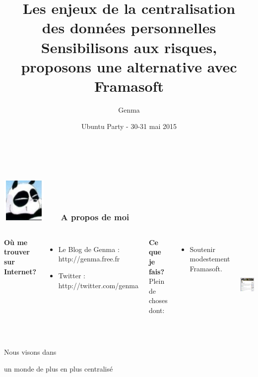 \documentclass{beamer}
\title[]{
Les enjeux de la centralisation \\ des données personnelles \\ Sensibilisons aux risques,  \\proposons une alternative avec Framasoft}
\author{Genma}
\date{Ubuntu Party - 30-31 mai 2015}
\begin{document}
\begin{frame}
	\titlepage
	\vfill
	\begin{center}
		\\[2.5ex]
		{\tiny\CcNote{\CcLongnameByNcSa}}
		\vspace*{-2.5ex}
	\end{center}
\end{frame}

\begin{frame}
\frametitle{\includegraphics[scale=0.4]{./images/Genma.jpg} \ \ \  A propos de moi  }
\begin{columns}[c] 

\textbf{Où me trouver sur Internet?}
\begin{itemize}
\item Le Blog de Genma : http://genma.free.fr
\item Twitter : http://twitter.com/genma
\end{itemize}

\textbf{Ce que je fais?}
\\ Plein de choses dont:
\begin{itemize}
\item Soutenir modestement Framasoft.
\end{itemize}

\includegraphics[width=5cm,height=5cm]{./images/blog.png} 
\end{columns}
\end{frame}


\begin{frame}
\Huge{\centerline{Nous visons dans}}
\Huge{\centerline{un monde de plus en plus centralisé}}
\end{frame}
\end{document}
